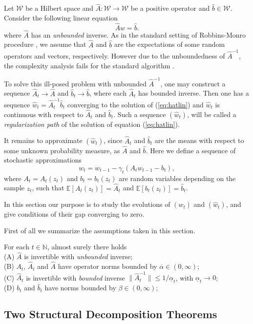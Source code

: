 \documentclass[twoside,11pt]{amsart}
\theoremstyle{theorem}
\theoremstyle{definition}
\theoremstyle{remark}
\def\E{{\mathbb E}}        %
\def\A{\hat{A}}
\def\b{\hat{b}}
\def\w{\hat{w}}
\def\W{{\mathscr W}}
\def\N{{\mathbb N}}
\def\amax{{\overline{\alpha}}}
\def\amin{{\underline{\alpha}} }
\begin{document}
Let $\W$ be a Hilbert space and $\A:\W\to \W$ be a positive operator and $\b\in \W$. Consider the following linear equation
\begin{equation} \label{eq:hatlin}
\A w = \b.
\end{equation}
where $\A$ has an \emph{unbounded} inverse. As in the standard setting of Robbins-Monro procedure \cite{RobMon51}, 
we assume that $\A$ and $\b$ are the expectations of some random operators and vectors, respectively.
However due to the unboundedness of $\A^{-1}$, the complexity analysis fails for the standard algorithm \cite{SmaYao05} . 

To solve this ill-posed problem with unbounded $\A^{-1}$, one may construct a sequence $\A_t\to \A$ and $\b_t\to \b$, 
where each $\A_t$ has bounded inverse. 
Then one has a sequence $\w_t=\A_t^{-1} \b_t$ converging to the solution of (\ref{eq:hatlin}) and $\w_t$ is continuous with respect
to $\A_t$ and $\b_t$. Such a sequence $(\w_t)$, will be called a \emph{regularization path} of the solution of equation (\ref{eq:hatlin}). 

It remains to approximate $(\w_t)$, since $\A_t$ and $\b_t$ are the means with respect to some unknown probability measure, as $\A$ and $\b$. 
Here we define a sequence of stochastic approximations
\[ w_{t}= w_{t-1} - \gamma_{t} ( A_t w_{t-1} - b_t ), \]
where $A_t=A_t(z_t)$ and $b_t=b_t(z_t)$ are random variables depending on the sample $z_t$, such that $\E[A_t(z_t)]=\A_t$ and $\E[b_t(z_t)]=\b_t$. 

In this section our purpose is to study the evolutions of $(w_t)$ and $(\w_t)$, and give conditions of their gap converging to zero.

First of all we summarize the assumptions taken in this section. 

 For each $t\in \N$, almost surely there holds \\
\noindent (A) $\A$ is invertible with \emph{unbounded} inverse; \\
\noindent (B) $A_t$, $\A_t$ and $\A$ have operator norms bounded by $\amax\in(0,\infty)$; \\
\noindent (C) $\A_t$ is invertible with \emph{bounded} inverse $\|\A^{-1}_t\|\leq 1/\amin_t$, with $\amin_t \to 0$; \\
(D) $b_t$ and $\b_t$ have norms bounded by $\beta\in(0,\infty)$;


\subsection{Two Structural Decomposition Theorems}
\end{document}
